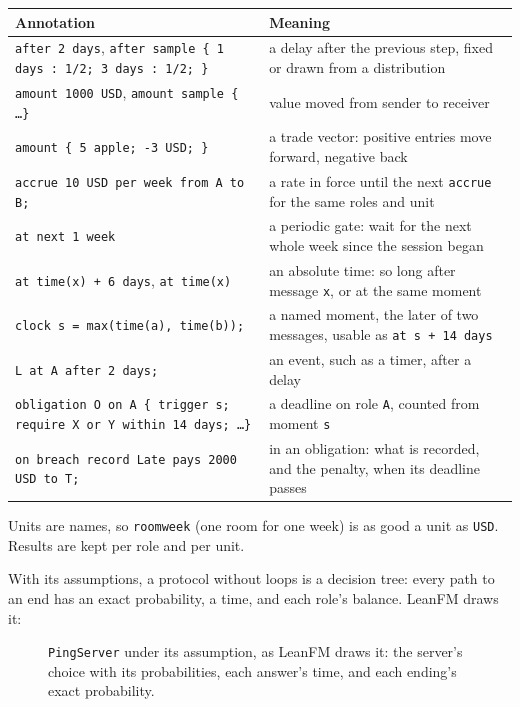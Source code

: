 \begin{center}
\small
\begin{tabular}{@{}p{}p{}@{}}
\toprule
Annotation & Meaning \\
\midrule
\texttt{after 2 days}, \texttt{after sample \{ 1 days : 1/2; 3 days : 1/2; \}} & a delay after the previous step, fixed or drawn from a distribution \\
\texttt{amount 1000 USD}, \texttt{amount sample \{ \ldots \}} & value moved from sender to receiver \\
\texttt{amount \{ 5 apple; -3 USD; \}} & a trade vector: positive entries move forward, negative back \\
\texttt{accrue 10 USD per week from A to B;} & a rate in force until the next \texttt{accrue} for the same roles and unit \\
\texttt{at next 1 week} & a periodic gate: wait for the next whole week since the session began \\
\texttt{at time(x) + 6 days}, \texttt{at time(x)} & an absolute time: so long after message \texttt{x}, or at the same moment \\
\texttt{clock s = max(time(a), time(b));} & a named moment, the later of two messages, usable as \texttt{at s + 14 days} \\
\texttt{L at A after 2 days;} & an event, such as a timer, after a delay \\
\texttt{obligation O on A \{ trigger s; require X or Y within 14 days; \ldots \}} & a deadline on role \texttt{A}, counted from moment \texttt{s} \\
\texttt{on breach record Late pays 2000 USD to T;} & in an obligation: what is recorded, and the penalty, when its deadline passes \\
\bottomrule
\end{tabular}
\end{center}

Units are names, so \texttt{roomweek} (one room for one week) is as good a unit as
\texttt{USD}. Results are kept per role and per unit.

With its assumptions, a protocol without loops is a decision tree: every path to
an end has an exact probability, a time, and each role's balance. LeanFM draws
it:

\begin{figure}[htbp]
\centering
{}
\caption{\texttt{PingServer} under its assumption, as LeanFM draws it: the server's
choice with its probabilities, each answer's time, and each ending's exact
probability.}
\label{fig:ping-tree}
\end{figure}

